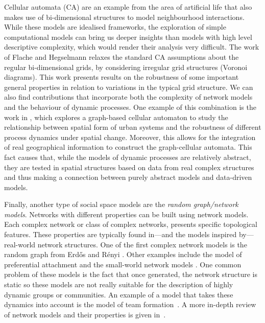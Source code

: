 \documentclass[preprint,number]{elsarticle}
\begin{document}
	Cellular automata (CA) are an example from the area of artificial life that also makes use of bi-dimensional structures to model neighbourhood interactions. While these models are idealised frameworks, the exploration of simple computational models can bring us deeper insights than models with high level descriptive complexity, which would render their analysis very difficult. The work of Flache and Hegselmann \cite{FlacheHegselmann2001} relaxes the standard CA assumptions about the regular bi-dimensional grids, by considering irregular grid structures (Voronoi diagrams). This work presents results on the robustness of some important general properties in relation to variations in the typical grid structure. We can also find contributions that incorporate both the complexity of network models and the behaviour of dynamic processes. One example of this combination is the work in \cite{Sullivan2000}, which explores a graph-based cellular automaton to study the relationship between spatial form of urban systems and the robustness of different process dynamics under spatial change. Moreover, this allows for the integration of real geographical information to construct the graph-cellular automata. This fact causes that, while the models of dynamic processes are relatively abstract, they are tested in spatial structures based on data from real complex structures and thus making a connection between purely abstract models and data-driven models.
	
	Finally, another type of social space models are the \textit{random graph/network models}. Networks with different properties can be built using network models. Each complex network or class of complex networks, presents specific topological features. These properties are typically found in---and the models inspired by---real-world network structures. One of the first complex network models is the random graph from Erd\H{o}s and Rényi \cite{Erdos1959}. Other examples include the model of preferential attachment \cite{Barabasi1999} and the small-world network models \cite{Watts1998}. One common problem of these models is the fact that once generated, the network structure is static so these models are not really suitable for the description of highly dynamic groups or communities. An example of a model that takes these dynamics into account is the model of team formation~\cite{Gaston2005}. A more in-depth review of network models and their properties is given in~\cite{Nunes2012}.
	
\end{document}
